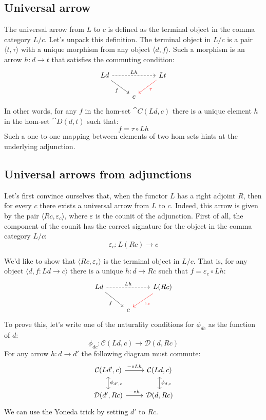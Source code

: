 \documentclass[DaoFP]{subfiles}
\begin{document}
\subsection{Universal arrow}

The universal arrow from $L$ to $c$ is defined as the terminal object in the comma category $L / c$. Let's unpack this definition. The terminal object in $L/c$ is a pair $\langle t, \tau \rangle$ with a unique morphism from any object $\langle d, f \rangle$. Such a morphism is an arrow $h \colon d \to t$ that satisfies the commuting condition:
\[
 \begin{tikzcd}
 L d
 \arrow[rd, "f"']
 \arrow[rr, dashed, "L h"]
 && L t
 \arrow[ld, red, "\tau"]
 \\
 &c
  \end{tikzcd}
\]
In other words, for any $f$ in the hom-set $\cat C (L d, c)$ there is a unique element $h$ in the hom-set $\cat D (d, t)$ such that:
\[ f = \tau \circ L h \]
Such a one-to-one mapping between elements of two hom-sets hints at the underlying adjunction. 

\subsection{Universal arrows from adjunctions}

Let's first convince ourselves that, when the functor $L$ has a right adjoint $R$, then for every $c$ there exists a universal arrow from $L$ to $c$. Indeed, this arrow is given by the pair $\langle R c, \varepsilon_c \rangle$, where $\varepsilon$ is the counit of the adjunction. First of all, the component of the counit has the correct signature for the object in the comma category $L/c$:
\[ \varepsilon_c \colon L (R c) \to c \]

We'd like to show that $\langle R c, \varepsilon_c \rangle$ is the terminal object in $L/c$. That is, for any object $\langle d, f \colon L d \to c \rangle$ there is a unique $h \colon d \to R c$ such that $f = \varepsilon_c \circ L h$:
\[
 \begin{tikzcd}
 L d
 \arrow[rd, "f"']
 \arrow[rr, dashed, "L h"]
 && L (R c)
 \arrow[ld, red, "\varepsilon_c"]
 \\
 &c
  \end{tikzcd}
\]
To prove this, let's write one of the naturality conditions for $\phi_{d c}$ as the function of $d$:
\[  \phi_{d c} \colon \mathcal{C} (L d, c) \to \mathcal{D}( d , R c)\]
For any arrow $h \colon d \to d'$ the following diagram must commute:
\[
 \begin{tikzcd}
 \mathcal{C}(L d', c)
 \arrow[d, leftrightarrow, "\phi_{d', c}"]
 \arrow[r, "- \circ L h"]
 &
 \mathcal{C}(L d, c)
  \arrow[d, leftrightarrow, "\phi_{d, c}"]
 \\
 \mathcal{D}(d', R c)
 \arrow[r, "- \circ h"]
& \mathcal{D}(d, R c)
 \end{tikzcd}
\]
We can use the Yoneda trick by setting $d'$ to $R c$.
\end{document}
